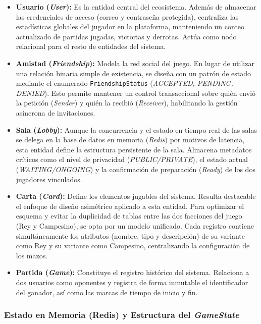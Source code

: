 \begin{itemize}
    \item \textbf{Usuario (\textit{User}):} Es la entidad central del ecosistema. Además de almacenar las credenciales de acceso (correo y contraseña protegida), centraliza las estadísticas globales del jugador en la plataforma, manteniendo un conteo actualizado de partidas jugadas, victorias y derrotas. Actúa como nodo relacional para el resto de entidades del sistema.
    
    \item \textbf{Amistad (\textit{Friendship}):} Modela la red social del juego. En lugar de utilizar una relación binaria simple de existencia, se diseña con un patrón de estado mediante el enumerado \texttt{FriendshipStatus} (\textit{ACCEPTED, PENDING, DENIED}). Esto permite mantener un control transaccional sobre quién envió la petición (\textit{Sender}) y quién la recibió (\textit{Receiver}), habilitando la gestión asíncrona de invitaciones.
    
    \item \textbf{Sala (\textit{Lobby}):} Aunque la concurrencia y el estado en tiempo real de las salas se delega en la base de datos en memoria (\textit{Redis}) por motivos de latencia, esta entidad define la estructura persistente de la sala. Almacena metadatos críticos como el nivel de privacidad (\textit{PUBLIC/PRIVATE}), el estado actual (\textit{WAITING/ONGOING}) y la confirmación de preparación (\textit{Ready}) de los dos jugadores vinculados.
    
    \item \textbf{Carta (\textit{Card}):} Define los elementos jugables del sistema. Resulta destacable el enfoque de diseño asimétrico aplicado a esta entidad. Para optimizar el esquema y evitar la duplicidad de tablas entre las dos facciones del juego (Rey y Campesino), se opta por un modelo unificado. Cada registro contiene simultáneamente los atributos (nombre, tipo y descripción) de su variante como Rey y su variante como Campesino, centralizando la configuración de los mazos.
    
    \item \textbf{Partida (\textit{Game}):} Constituye el registro histórico del sistema. Relaciona a dos usuarios como oponentes y registra de forma inmutable el identificador del ganador, así como las marcas de tiempo de inicio y fin. 
\end{itemize}

\subsubsection{Estado en Memoria (Redis) y Estructura del \textit{GameState}}

